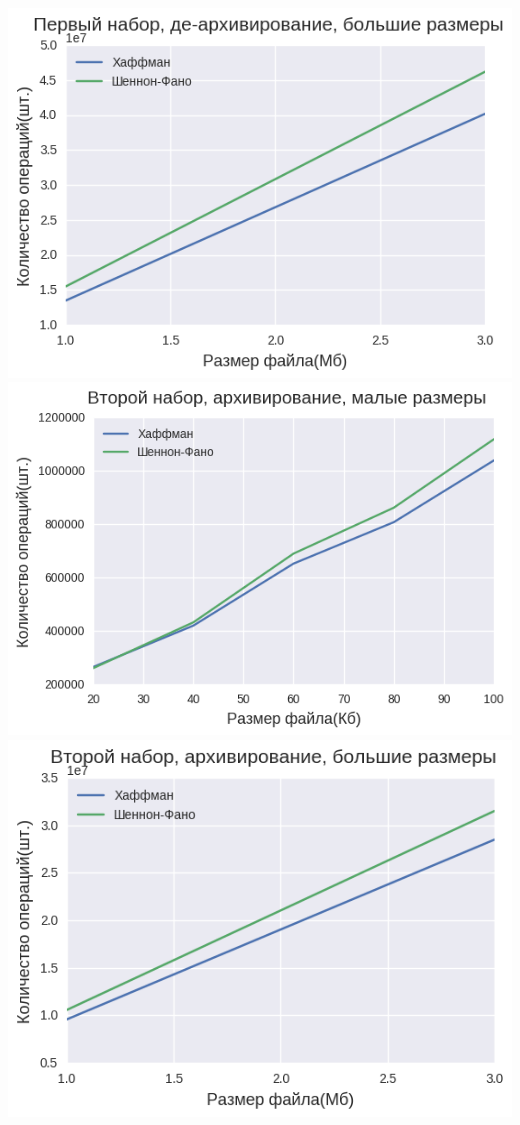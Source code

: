 \documentclass[russian, a4paper, 12pt]{article}
\begin{document}
\begin{center}
\includegraphics[width=0.9\linewidth]{./plots/2/2_1_2_2.png}\\
\includegraphics[width=0.9\linewidth]{./plots/2/2_2_1_1.png}\\
\includegraphics[width=0.9\linewidth]{./plots/2/2_2_1_2.png}\\

\end{center}
\end{document}
